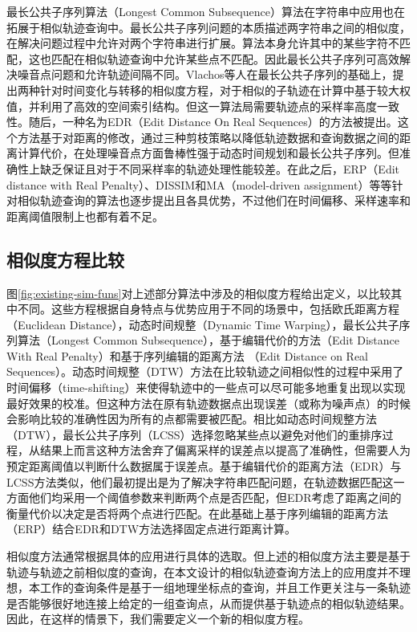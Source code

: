 最长公共子序列算法（Longest Common Subsequence）算法在字符串中应用也在拓展于相似轨迹查询中。最长公共子序列问题的本质描述两字符串之间的相似度，在解决问题过程中允许对两个字符串进行扩展。算法本身允许其中的某些字符不匹配，这也匹配在相似轨迹查询中允许某些点不匹配。因此最长公共子序列可高效解决噪音点问题和允许轨迹间隔不同。Vlachos等人在最长公共子序列的基础上，提出两种针对时间变化与转移的相似度方程\cite{vlachos2002discovering}，对于相似的子轨迹在计算中基于较大权值，并利用了高效的空间索引结构。但这一算法局需要轨迹点的采样率高度一致性。随后，一种名为EDR（Edit Distance On Real Sequences）的方法被提出\cite{chen2005robust}。这个方法基于对距离的修改，通过三种剪枝策略以降低轨迹数据和查询数据之间的距离计算代价，在处理噪音点方面鲁棒性强于动态时间规划和最长公共子序列。但准确性上缺乏保证且对于不同采样率的轨迹处理性能较差。在此之后，ERP（Edit distance with Real Penalty）\cite{chen2004marriage}、DISSIM\cite{frentzos2007index}和MA（model-driven assignment）\cite{sankararaman2013model}等等针对相似轨迹查询的算法也逐步提出且各具优势，不过他们在时间偏移、采样速率和距离阈值限制上也都有着不足。


\subsection{相似度方程比较}
\label{subsec:situation-sim-fun-compare}


图\ref{fig:existing-sim-funs}对上述部分算法中涉及的相似度方程给出定义，以比较其中不同。这些方程根据自身特点与优势应用于不同的场景中\cite{morse2007efficient}，包括欧氏距离方程（Euclidean Distance），动态时间规整（Dynamic Time Warping），最长公共子序列算法（Longest Common Subsequence），基于编辑代价的方法（Edit Distance With Real Penalty）和基于序列编辑的距离方法 （Edit Distance on Real Sequences）。动态时间规整（DTW）方法在比较轨迹之间相似性的过程中采用了时间偏移（time-shifting）来使得轨迹中的一些点可以尽可能多地重复出现以实现最好效果的校准。但这种方法在原有轨迹数据点出现误差（或称为噪声点）的时候会影响比较的准确性因为所有的点都需要被匹配。相比如动态时间规整方法（DTW），最长公共子序列（LCSS）选择忽略某些点以避免对他们的重排序过程，从结果上而言这种方法舍弃了偏离采样的误差点以提高了准确性，但需要人为预定距离阈值以判断什么数据属于误差点。基于编辑代价的距离方法（EDR）与LCSS方法类似，他们最初提出是为了解决字符串匹配问题，在轨迹数据匹配这一方面他们均采用一个阈值参数来判断两个点是否匹配，但EDR考虑了距离之间的衡量代价以决定是否将两个点进行匹配。在此基础上基于序列编辑的距离方法（ERP）结合EDR和DTW方法选择固定点进行距离计算。

相似度方法通常根据具体的应用进行具体的选取。但上述的相似度方法主要是基于轨迹与轨迹之前相似度的查询，在本文设计的相似轨迹查询方法上的应用度并不理想，本工作的查询条件是基于一组地理坐标点的查询，并且工作更关注与一条轨迹是否能够很好地连接上给定的一组查询点，从而提供基于轨迹点的相似轨迹结果。因此，在这样的情景下，我们需要定义一个新的相似度方程。

